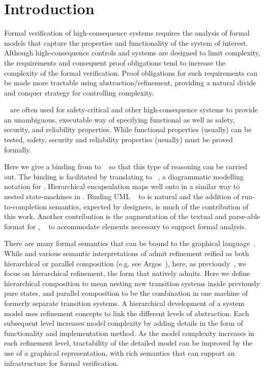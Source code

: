 
\section{Introduction}
\label{sec:introduction}

Formal verification of high-consequence systems requires the analysis
of formal models that capture the properties and functionality of the
system of interest. Although high-consequence controls and systems are
designed to limit complexity, the requirements and consequent proof
obligations tend to increase the complexity of the formal verification.  
Proof obligations for such requirements can be made more tractable using
abstraction/refinement, providing a natural divide and conquer
strategy for controlling complexity.

\Statecharts~\cite{Harel} are often used for safety-critical and other high-consequence systems to provide an unambiguous, executable way of specifying functional as well as safety, security, and reliability properties.  
While functional properties (usually) can be tested, safety, security and reliability properties (usually) must be proved formally.  

Here we give a binding from \Statecharts to \EventB~\cite{abrial10:_model_event_b} so that this type of reasoning can be carried out.
The binding is facilitated by translating to \iUMLB~\cite{snook14:_b_statem,Snook2006,Snook12:FMCO}, a diagrammatic modelling notation for \EventB.
Hierarchical encapsulation maps well onto \Statecharts in a similar way to nested state-machines in \iUMLB.
Binding UML \Statecharts~\cite{Rumbaugh2004} to \iUMLB is natural and the addition of run-to-completion semantics, expected by \Statechart
designers, is much of the contribution of this work.  
Another contribution is the augmentation of the textual and parse-able format for \Statecharts, \SCXML~\cite{scxmlwebsite} to accommodate elements necessary to support formal analysis. 

There are many formal semantics that can be bound to 
 the \Statechart graphical language~\cite{Eshuis_2009}. While \Statecharts and various semantic interpretations of
\Statecharts admit refinement reified as both hierarchical or parallel
composition (e.g. see Argos~\cite{Maraninchi91theargos}), here, as
previously~\cite{snook14:_b_statem}, we focus on hierarchical
refinement, the form that \EventB natively admits.  Here we define
hierarchical composition to mean nesting new transition systems inside
previously pure states, and parallel composition to be the combination
in one machine of formerly separate transition systems.
A hierarchical development of a system model uses refinement
concepts to link the different levels of abstraction. Each subsequent
level increases model complexity by adding details in the form of
functionality and implementation method. As the model complexity
increases in each refinement level, tractability of the detailed model
can be improved by the use of a graphical representation, with rich
semantics that can support an infrastructure for formal verification.


